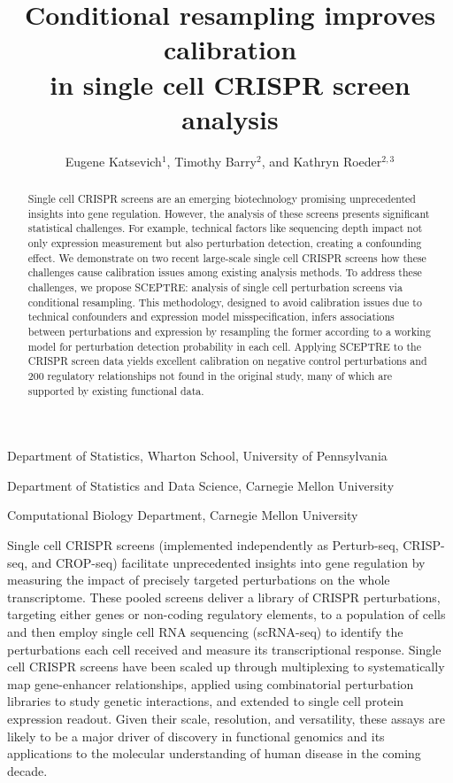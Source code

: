 \documentclass{nature}
\title{Conditional resampling improves calibration \\ in single cell CRISPR screen analysis}
\author{Eugene Katsevich$^{1}$, Timothy Barry$^{2}$, and Kathryn Roeder$^{2,3}$}
\begin{document}
\maketitle

\addtocounter{page}{-1}
\thispagestyle{empty}

\begin{affiliations}
 \item Department of Statistics, Wharton School, University of Pennsylvania
 \item Department of Statistics and Data Science, Carnegie Mellon University
 \item Computational Biology Department, Carnegie Mellon University
\end{affiliations}


\begin{abstract}
Single cell CRISPR screens are an emerging biotechnology promising unprecedented insights into gene regulation. However, the analysis of these screens presents significant statistical challenges. For example, technical factors like sequencing depth impact not only expression measurement but also perturbation detection, creating a confounding effect. We demonstrate on two recent large-scale single cell CRISPR screens how these challenges cause calibration issues among existing analysis methods. To address these challenges, we propose SCEPTRE: analysis of single cell perturbation screens via conditional resampling. This methodology, designed to avoid calibration issues due to technical confounders and expression model misspecification, infers associations between perturbations and expression by resampling the former according to a working model for perturbation detection probability in each cell. Applying SCEPTRE to the CRISPR screen data yields excellent calibration on negative control perturbations and 200 regulatory relationships not found in the original study, many of which are supported by existing functional data.
\end{abstract}

\clearpage

Single cell CRISPR screens (implemented independently as Perturb-seq\cite{Dixit2016, Adamson2016}, CRISP-seq\cite{Jaitin2016}, and CROP-seq\cite{Datlinger2017}) facilitate unprecedented insights into gene regulation by measuring the impact of precisely targeted perturbations on the whole transcriptome. These pooled screens deliver a library of CRISPR perturbations, targeting either genes or non-coding regulatory elements, to a population of cells and then employ single cell RNA sequencing (scRNA-seq) to identify the perturbations each cell received and measure its transcriptional response. Single cell CRISPR screens have been scaled up through multiplexing to systematically map gene-enhancer relationships\cite{Xie2017,Gasperini2019,Xie2019}, applied using combinatorial perturbation libraries to study genetic interactions\cite{Norman2019}, and extended to single cell protein expression readout\cite{Mimitou2019,Frangieh2020}. Given their scale, resolution, and versatility, these assays are likely to be a major driver of discovery in functional genomics and its applications to the molecular understanding of human disease in the coming decade\cite{Gasperini2020}. 
\end{document}
